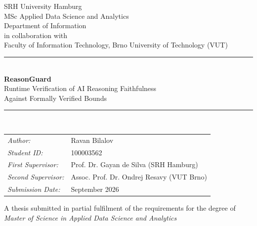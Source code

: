 \begin{titlepage}
  \begin{center}
    \vspace*{1.0cm}
    {\Large SRH University Hamburg}\\[0.4cm]
    {\large MSc Applied Data Science and Analytics}\\[0.4cm]
    {\large Department of Information}\\[0.2cm]
    {\large in collaboration with}\\[0.2cm]
    {\large Faculty of Information Technology, Brno University of Technology (VUT)}\\[1.5cm]

    \rule{\linewidth}{0.4pt}\\[0.5cm]
    {\huge\bfseries ReasonGuard}\\[0.3cm]
    {\Large Runtime Verification of AI Reasoning Faithfulness}\\[0.2cm]
    {\Large Against Formally Verified Bounds}\\[0.5cm]
    \rule{\linewidth}{0.4pt}\\[1.5cm]

    \begin{tabular}{ll}
      \emph{Author:}            & Ravan Bilalov \\
      \emph{Student ID:}        & 100003562 \\
      \emph{First Supervisor:}  & Prof. Dr. Gayan de Silva (SRH Hamburg) \\
      \emph{Second Supervisor:} & Assoc. Prof. Dr. Ondrej Resavy (VUT Brno) \\
      \emph{Submission Date:}   & September 2026 \\
    \end{tabular}

    \vfill
    {\large A thesis submitted in partial fulfilment of the requirements for the degree of}\\[0.2cm]
    {\large \emph{Master of Science in Applied Data Science and Analytics}}\\[1.0cm]
  \end{center}
\end{titlepage}
